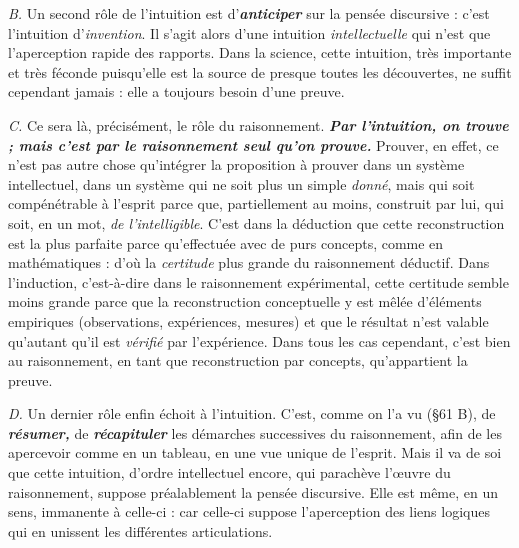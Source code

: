 {\it B.} Un second rôle de l'intuition est d’\textbf{\textit {anticiper}} sur la pensée discursive :
c’est l'intuition d'{\it invention}. Il s’agit alors d’une intuition
{\it intellectuelle} qui n’est que l’aperception rapide des rapports. Dans
la science, cette intuition, très importante et très féconde puisqu'elle
est la source de presque toutes les découvertes, ne suffit cependant
jamais : elle a toujours besoin d’une preuve.

{\it C.} Ce sera là, précisément, le rôle du raisonnement. \textbf{\textit {Par l'intuition,
on trouve ; mais c'est par le raisonnement seul qu’on prouve.}}
Prouver, en effet, ce n’est pas autre chose qu’intégrer la proposition
à prouver dans un système intellectuel, dans un système qui ne soit
plus un simple {\it donné}, mais qui soit compénétrable à l’esprit parce
que, partiellement au moins, construit par lui, qui soit, en un mot,
{\it de l’intelligible}. C'est dans la déduction que cette reconstruction est
la plus parfaite parce qu’effectuée avec de purs concepts, comme en
mathématiques : d’où la {\it certitude} plus grande du raisonnement
déductif. Dans l'induction, c’est-à-dire dans le raisonnement expérimental,
cette certitude semble moins grande parce que la reconstruction
conceptuelle y est mêlée d’éléments empiriques (observations,
expériences, mesures) et que le résultat n’est valable qu’autant qu’il
est {\it vérifié} par l’expérience. Dans tous les cas cependant, c’est bien au
raisonnement, en tant que reconstruction par concepts, qu’appartient
la preuve.

{\it D.} Un dernier rôle enfin échoit à l’intuition. C’est, comme on l’a vu
(\S 61 B), de \textbf{\textit {résumer,}} de \textbf{\textit {récapituler}} les démarches successives du
raisonnement, afin de les apercevoir comme en un tableau, en une
vue unique de l’esprit. Mais il va de soi que cette intuition, d’ordre
intellectuel encore, qui parachève l’œuvre du raisonnement, suppose
préalablement la pensée discursive. Elle est même, en un sens, immanente
à celle-ci : car celle-ci suppose l’aperception des liens logiques
qui en unissent les différentes articulations.

